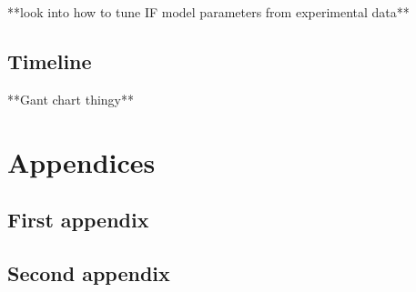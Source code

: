 **look into how to tune IF model parameters from experimental data**

\subsection{Timeline}
**Gant chart thingy**



\newpage


\newpage

\appendix
\section*{Appendices}
\renewcommand{\thesubsection}{\Alph{subsection}}
\subsection{First appendix}
\subsection{Second appendix}


